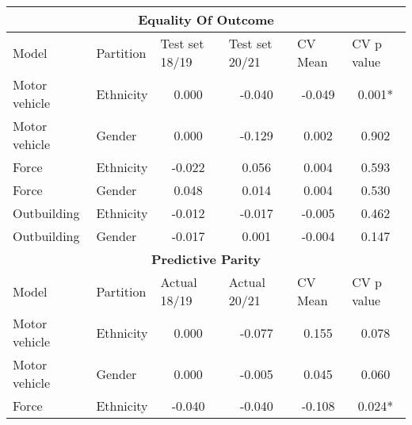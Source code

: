 
\begin{table}[]
\begin{tabular}{@{}llcccc@{}}
\toprule
\multicolumn{6}{c}{\textbf{Equality Of Outcome}}                                                                                                                  \\ \midrule
Model         & Partition & \multicolumn{1}{l}{Test set 18/19} & \multicolumn{1}{l}{Test set 20/21} & \multicolumn{1}{l}{CV Mean} & \multicolumn{1}{l}{CV p value} \\\midrule
Motor vehicle & Ethnicity & 0.000                            & -0.040                           & -0.049                   & 0.001*                      \\
Motor vehicle & Gender    & 0.000                            & -0.129                           & 0.002                    & 0.902                       \\
Force         & Ethnicity & -0.022                           & 0.056                            & 0.004                    & 0.593                       \\
Force         & Gender    & 0.048                            & 0.014                            & 0.004                    & 0.530                       \\
Outbuilding   & Ethnicity & -0.012                           & -0.017                           & -0.005                   & 0.462                       \\
Outbuilding   & Gender    & -0.017                           & 0.001                            & -0.004                   & 0.147                       \\\midrule
\multicolumn{6}{c}{\textbf{Predictive Parity} }                                                                                                                   \\
Model         & Partition & \multicolumn{1}{l}{Actual 18/19} & \multicolumn{1}{l}{Actual 20/21} & \multicolumn{1}{l}{CV Mean} & \multicolumn{1}{l}{CV p value} \\\midrule
Motor vehicle & Ethnicity & 0.000                            & -0.077                           & 0.155                    & 0.078                       \\
Motor vehicle & Gender    & 0.000                            & -0.005                           & 0.045                    & 0.060                       \\
Force         & Ethnicity & -0.040                           & -0.040                           & -0.108                   & 0.024*                      \\

\end{tabular}
\end{table}
